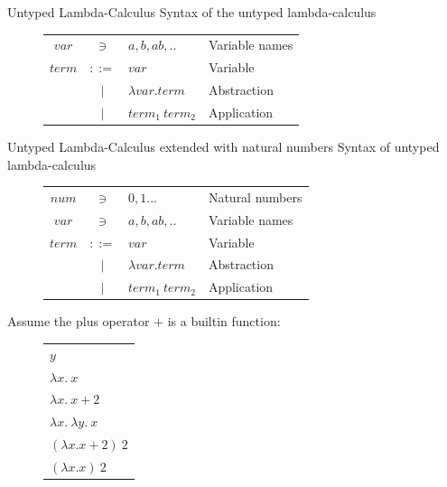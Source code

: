\documentclass[pdf]{beamer}
\begin{document}
\begin{frame}{Untyped Lambda-Calculus}
Syntax of the untyped lambda-calculus
  \begin{figure}[H]
    \centering
    \begin{tabular}{c c l l}
      $var$  & $\ni$   & $a,b,ab,..$         & Variable names  \\
      $term$ & $::=$ & $var$               & Variable \\
             & $|$   & $\lambda var. term$       & Abstraction \\
             & $|$   & $term_1 \: term_{2}$ & Application \\
    \end{tabular}
  \end{figure}
\end{frame}

\begin{frame}{Untyped Lambda-Calculus extended with natural numbers}
  Syntax of untyped lambda-calculus
    \begin{figure}[H]
    \centering
    \begin{tabular}{c c l l}
      $num$  & $\ni$   & $0,1 ...$           & Natural numbers \\
      $var$  & $\ni$   & $a,b,ab,..$         & Variable names  \\
      $term$ & $::=$ & $var$               & Variable        \\
             & $|$   & $\lambda var. term$       & Abstraction    \\
             & $|$   & $term_1 \: term_{2}$ & Application     \\
    \end{tabular}
    \end{figure}

    Assume the plus operator $+$ is a builtin function:
    \begin{figure}
    \begin{tabular}{l}
      $y$ \\

      $\lambda x. \: x$ \\
      $\lambda x. \: x + 2$ \\
      $\lambda x. \: \lambda y. \: x$ \\

      $(\lambda x. x + 2) \: 2$ \\
      $(\lambda x. x) \: 2$ \\
    \end{tabular}
  \end{figure}
\end{frame}
\end{document}
